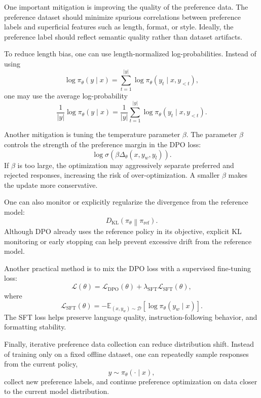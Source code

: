 One important mitigation is improving the quality of the preference data. The preference dataset should minimize spurious correlations between preference labels and superficial features such as length, format, or style. Ideally, the preference label should reflect semantic quality rather than dataset artifacts.

To reduce length bias, one can use length-normalized log-probabilities. Instead of using
\[
    \log \pi_\theta(y\mid x)
    =
    \sum_{t=1}^{|y|}
    \log \pi_\theta(y_t\mid x,y_{<t}),
\]
one may use the average log-probability
\[
    \frac{1}{|y|}
    \log \pi_\theta(y\mid x)
    =
    \frac{1}{|y|}
    \sum_{t=1}^{|y|}
    \log \pi_\theta(y_t\mid x,y_{<t}).
\]

Another mitigation is tuning the temperature parameter $\beta$. The parameter $\beta$ controls the strength of the preference margin in the DPO loss:
\[
    \log \sigma
    \left(
        \beta \Delta_\theta(x,y_w,y_l)
    \right).
\]
If $\beta$ is too large, the optimization may aggressively separate preferred and rejected responses, increasing the risk of over-optimization. A smaller $\beta$ makes the update more conservative.

One can also monitor or explicitly regularize the divergence from the reference model:
\[
    D_{\mathrm{KL}}
    \left(
        \pi_\theta
        \middle\|
        \pi_{\mathrm{ref}}
    \right).
\]
Although DPO already uses the reference policy in its objective, explicit KL monitoring or early stopping can help prevent excessive drift from the reference model.

Another practical method is to mix the DPO loss with a supervised fine-tuning loss:
\[
    \mathcal{L}(\theta)
    =
    \mathcal{L}_{\mathrm{DPO}}(\theta)
    +
    \lambda_{\mathrm{SFT}}
    \mathcal{L}_{\mathrm{SFT}}(\theta),
\]
where
\[
    \mathcal{L}_{\mathrm{SFT}}(\theta)
    =
    -
    \mathbb{E}_{(x,y_w)\sim\mathcal{D}}
    \left[
        \log \pi_\theta(y_w\mid x)
    \right].
\]
The SFT loss helps preserve language quality, instruction-following behavior, and formatting stability.

Finally, iterative preference data collection can reduce distribution shift. Instead of training only on a fixed offline dataset, one can repeatedly sample responses from the current policy,
\[
    y\sim \pi_\theta(\cdot\mid x),
\]
collect new preference labels, and continue preference optimization on data closer to the current model distribution.
